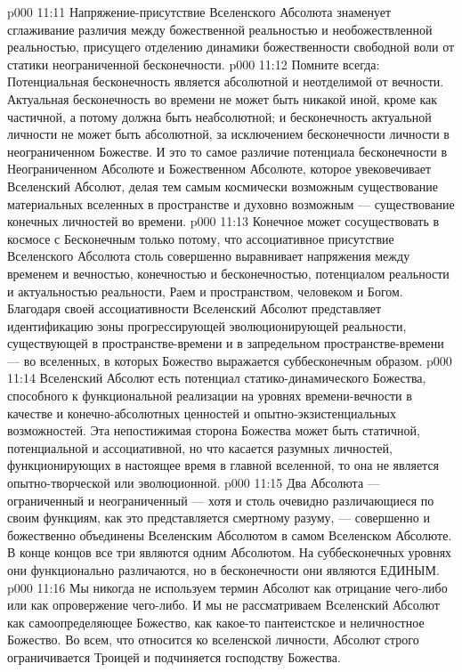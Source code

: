 \vs p000 11:11 \pc Напряжение\hyp{}присутствие Вселенского Абсолюта знаменует сглаживание различия между божественной реальностью и необожествленной реальностью, присущего отделению динамики божественности свободной воли от статики неограниченной бесконечности.
\vs p000 11:12 \pc Помните всегда: Потенциальная бесконечность является абсолютной и неотделимой от вечности. Актуальная бесконечность во времени не может быть никакой иной, кроме как частичной, а потому должна быть неабсолютной; и бесконечность актуальной личности не может быть абсолютной, за исключением бесконечности личности в неограниченном Божестве. И это то самое различие потенциала бесконечности в Неограниченном Абсолюте и Божественном Абсолюте, которое увековечивает Вселенский Абсолют, делая тем самым космически возможным существование материальных вселенных в пространстве и духовно возможным --- существование конечных личностей во времени.
\vs p000 11:13 Конечное может сосуществовать в космосе с Бесконечным только потому, что ассоциативное присутствие Вселенского Абсолюта столь совершенно выравнивает напряжения между временем и вечностью, конечностью и бесконечностью, потенциалом реальности и актуальностью реальности, Раем и пространством, человеком и Богом. Благодаря своей ассоциативности Вселенский Абсолют представляет идентификацию зоны прогрессирующей эволюционирующей реальности, существующей в пространстве\hyp{}времени и в запредельном пространстве\hyp{}времени --- во вселенных, в которых Божество выражается суббесконечным образом.
\vs p000 11:14 Вселенский Абсолют есть потенциал статико\hyp{}динамического Божества, способного к функциональной реализации на уровнях времени\hyp{}вечности в качестве и конечно\hyp{}абсолютных ценностей и опытно\hyp{}экзистенциальных возможностей. Эта непостижимая сторона Божества может быть статичной, потенциальной и ассоциативной, но что касается разумных личностей, функционирующих в настоящее время в главной вселенной, то она не является опытно\hyp{}творческой или эволюционной.
\vs p000 11:15 \pc {} Два Абсолюта --- ограниченный и неограниченный --- хотя и столь очевидно различающиеся по своим функциям, как это представляется смертному разуму, --- совершенно и божественно объединены Вселенским Абсолютом в самом Вселенском Абсолюте. В конце концов все три являются одним Абсолютом. На суббесконечных уровнях они функционально различаются, но в бесконечности они являются ЕДИНЫМ.
\vs p000 11:16 \pc Мы никогда не используем термин Абсолют как отрицание чего\hyp{}либо или как опровержение чего\hyp{}либо. И мы не рассматриваем Вселенский Абсолют как самоопределяющее Божество, как какое\hyp{}то пантеистское и неличностное Божество. Во всем, что относится ко вселенской личности, Абсолют строго ограничивается Троицей и подчиняется господству Божества.
